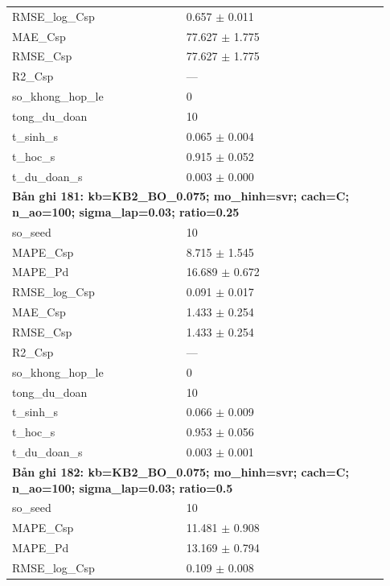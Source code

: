 \begin{longtable}{p{0.43\linewidth}p{0.50\linewidth}}
RMSE\_\allowbreak log\_\allowbreak Csp & 0.657 $\pm$ 0.011 \\
MAE\_\allowbreak Csp & 77.627 $\pm$ 1.775 \\
RMSE\_\allowbreak Csp & 77.627 $\pm$ 1.775 \\
R2\_\allowbreak Csp & — \\
so\_\allowbreak khong\_\allowbreak hop\_\allowbreak le & 0 \\
tong\_\allowbreak du\_\allowbreak doan & 10 \\
t\_\allowbreak sinh\_\allowbreak s & 0.065 $\pm$ 0.004 \\
t\_\allowbreak hoc\_\allowbreak s & 0.915 $\pm$ 0.052 \\
t\_\allowbreak du\_\allowbreak doan\_\allowbreak s & 0.003 $\pm$ 0.000 \\
\midrule
\multicolumn{2}{p{0.95\linewidth}}{\textbf{Bản ghi 181: kb=KB2\_BO\_0.075; mo\_hinh=svr; cach=C; n\_ao=100; sigma\_lap=0.03; ratio=0.25}} \\
so\_\allowbreak seed & 10 \\
MAPE\_\allowbreak Csp & 8.715 $\pm$ 1.545 \\
MAPE\_\allowbreak Pd & 16.689 $\pm$ 0.672 \\
RMSE\_\allowbreak log\_\allowbreak Csp & 0.091 $\pm$ 0.017 \\
MAE\_\allowbreak Csp & 1.433 $\pm$ 0.254 \\
RMSE\_\allowbreak Csp & 1.433 $\pm$ 0.254 \\
R2\_\allowbreak Csp & — \\
so\_\allowbreak khong\_\allowbreak hop\_\allowbreak le & 0 \\
tong\_\allowbreak du\_\allowbreak doan & 10 \\
t\_\allowbreak sinh\_\allowbreak s & 0.066 $\pm$ 0.009 \\
t\_\allowbreak hoc\_\allowbreak s & 0.953 $\pm$ 0.056 \\
t\_\allowbreak du\_\allowbreak doan\_\allowbreak s & 0.003 $\pm$ 0.001 \\
\midrule
\multicolumn{2}{p{0.95\linewidth}}{\textbf{Bản ghi 182: kb=KB2\_BO\_0.075; mo\_hinh=svr; cach=C; n\_ao=100; sigma\_lap=0.03; ratio=0.5}} \\
so\_\allowbreak seed & 10 \\
MAPE\_\allowbreak Csp & 11.481 $\pm$ 0.908 \\
MAPE\_\allowbreak Pd & 13.169 $\pm$ 0.794 \\
RMSE\_\allowbreak log\_\allowbreak Csp & 0.109 $\pm$ 0.008 \\

\end{longtable}
